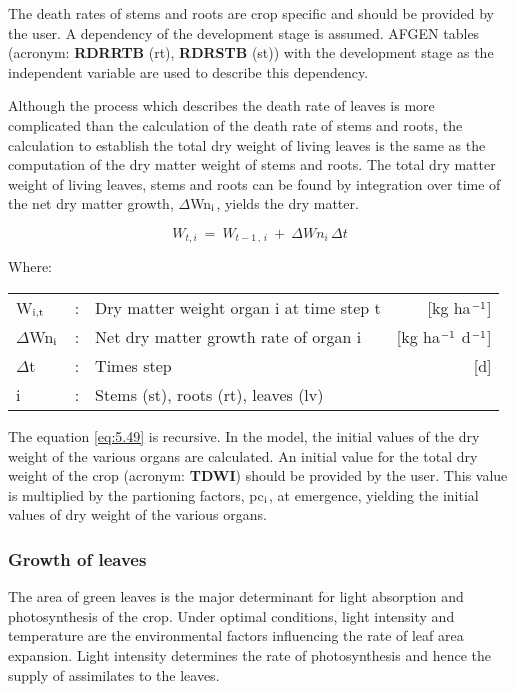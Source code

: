 The death rates of stems and roots are crop specific and should be provided by the user.
A dependency of the development stage is assumed. AFGEN tables (acronym: {\bf RDRRTB}
(rt), {\bf RDRSTB} (st)) with the development stage as the independent variable are used to
describe this dependency.

Although the process which describes the death rate of leaves is more complicated than
the calculation of the death rate of stems and roots, the calculation to establish the total
dry weight of living leaves is the same as the computation of the dry matter weight of
stems and roots. The total dry matter weight of living leaves, stems and roots can be
found by integration over time of the net dry matter growth, $\Delta$Wn$_{{\rm i}}$, yields 
the dry matter.

\begin{equation}
\label{eq:5.49}
W _{t,i} ~=~W _{t-1\, ,\, i} ~+~\Delta Wn _{i} \,\Delta t
\end{equation}

Where:\\[5pt]
\begin{tabularx}{\textwidth}{llXr}
W$_{{\rm i,t}}$ &:& Dry matter weight organ i at time step t   &
     [kg ha$^{{\rm -1}}$]\\
$\Delta$Wn$_{{\rm i}}$ &:& Net dry matter growth rate of organ i   &
     [kg ha$^{{\rm -1}}$ d$^{{\rm -1}}$]\\
$\Delta$t &:& Times step   &
     [d]\\
i &:& Stems (st), roots (rt), leaves (lv)\\
\end{tabularx}

The equation \ref{eq:5.49} is recursive. In the model, the initial values of the dry weight of the
various organs are calculated. An initial value for the total dry weight of the crop
(acronym: {\bf TDWI}) should be provided by the user. This value is multiplied by the
partioning factors, pc$_{{\rm i}}$, at emergence, yielding the initial values of dry weight of the
various organs.

\subsubsection{Growth of leaves}
The area of green leaves is the major determinant for light absorption and photosynthesis
of the crop. Under optimal conditions, light intensity and temperature are the environmental factors influencing the rate of leaf area expansion. Light intensity determines the
rate of photosynthesis and hence the supply of assimilates to the leaves.

